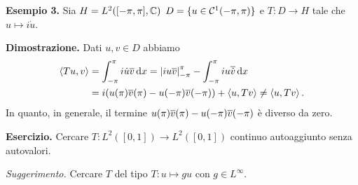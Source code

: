 \textbf{Esempio 3.} Sia $H = L^2([-\pi,\pi], \mathbb C)$ $D = \{ u \in \mathcal{C}^1(-\pi,\pi) \}$ e $T \colon D \to H$ tale che $u \mapsto i\dot u$.

\textbf{Dimostrazione.} Dati $u,v \in D$ abbiamo
\begin{align*}
	\left<Tu,v \right> & = \int_{-\pi}^{\pi} i \dot u \overline{v} \,\mathrm{d} x  = \left| i u \overline{v} \right|_{-\pi}^\pi - \int_{-\pi}^\pi i u \overline{\dot v} \,\mathrm{d} x \\
	& = i (u(\pi) \overline{v}(\pi) - u(- \pi) \overline{v}(-\pi)) + \left<u, Tv \right> \neq \left<u, Tv \right>.
\end{align*}
In quanto, in generale, il termine $u(\pi) \overline{v}(\pi) - u(- \pi) \overline{v}(-\pi)$ è diverso da zero.


\textbf{Esercizio.} Cercare $T \colon L^2([0,1]) \to L^2([0,1])$ continuo autoaggiunto senza autovalori.

\textit{Suggerimento.} Cercare $T$ del tipo $T \colon u \mapsto gu$ con $g \in L^\infty$.
